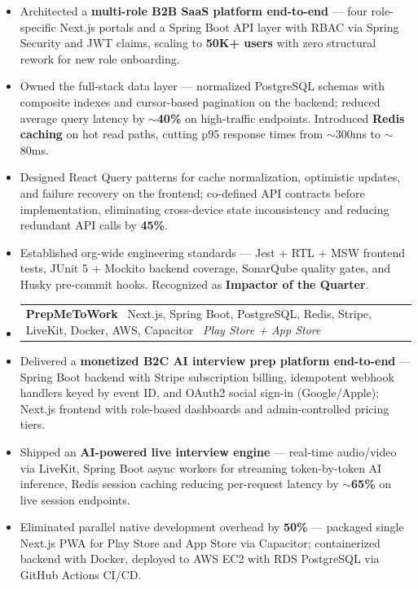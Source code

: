 \documentclass[letterpaper,10pt]{article}
\makeatletter
\newcommand{\resumeItem}[1]{
  \item\normalsize{#1 \vspace{-3pt}}
}
\newcommand{\resumeProjectLine}[1]{
  \vspace{-2pt}\item
    \begin{tabular*}{1.0\textwidth}[t]{l@{\extracolsep{\fill}}r}
      \normalsize#1 & \\
    \end{tabular*}\vspace{-7pt}
}
\newcommand{\resumeSubHeadingListStart}{\begin{itemize}[leftmargin=0.0in, label={}]}
\newcommand{\resumeSubHeadingListEnd}{\end{itemize}}
\newcommand{\resumeItemListStart}{\begin{itemize}[leftmargin=0.15in]}
\newcommand{\resumeItemListEnd}{\end{itemize}\vspace{-5pt}}
\makeatother
\begin{document}
\vspace{-3pt}
\resumeItemListStart
  \resumeItem{Architected a \textbf{multi-role B2B SaaS platform end-to-end} --- four role-specific Next.js portals and a Spring Boot API layer with RBAC via Spring Security and JWT claims, scaling to \textbf{50K+ users} with zero structural rework for new role onboarding.}
  \resumeItem{Owned the full-stack data layer --- normalized PostgreSQL schemas with composite indexes and cursor-based pagination on the backend; reduced average query latency by \textbf{$\sim$40\%} on high-traffic endpoints. Introduced \textbf{Redis caching} on hot read paths, cutting p95 response times from $\sim$300ms to $\sim$80ms.}
  \resumeItem{Designed React Query patterns for cache normalization, optimistic updates, and failure recovery on the frontend; co-defined API contracts before implementation, eliminating cross-device state inconsistency and reducing redundant API calls by \textbf{45\%}.}
  \resumeItem{Established org-wide engineering standards --- Jest + RTL + MSW frontend tests, JUnit 5 + Mockito backend coverage, SonarQube quality gates, and Husky pre-commit hooks. Recognized as \textbf{Impactor of the Quarter}.}
\resumeItemListEnd

\vspace{1pt}

\resumeSubHeadingListStart
  \resumeProjectLine{{\textbf{PrepMeToWork}} \textbar\ \normalfont Next.js, Spring Boot, PostgreSQL, Redis, Stripe, LiveKit, Docker, AWS, Capacitor \textbar\ \textit{Play Store + App Store}}
\resumeSubHeadingListEnd

\vspace{-4pt}
\resumeItemListStart
  \resumeItem{Delivered a \textbf{monetized B2C AI interview prep platform end-to-end} --- Spring Boot backend with Stripe subscription billing, idempotent webhook handlers keyed by event ID, and OAuth2 social sign-in (Google/Apple); Next.js frontend with role-based dashboards and admin-controlled pricing tiers.}
  \resumeItem{Shipped an \textbf{AI-powered live interview engine} --- real-time audio/video via LiveKit, Spring Boot async workers for streaming token-by-token AI inference, Redis session caching reducing per-request latency by \textbf{$\sim$65\%} on live session endpoints.}
  \resumeItem{Eliminated parallel native development overhead by \textbf{50\%} --- packaged single Next.js PWA for Play Store and App Store via Capacitor; containerized backend with Docker, deployed to AWS EC2 with RDS PostgreSQL via GitHub Actions CI/CD.}
\resumeItemListEnd
\end{document}
